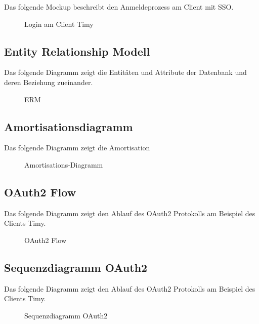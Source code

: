 Das folgende Mockup beschreibt den Anmeldeprozess am Client mit \acs{SSO}.
\begin{figure}[htb]
\centering
{}
\caption{Login am Client Timy}
\end{figure}
\clearpage

\subsection{Entity Relationship Modell}
\label{app:ERM}
Das folgende Diagramm zeigt die Entitäten und Attribute der Datenbank und deren Beziehung zueinander.
\begin{figure}[htb]
\centering
{}
\caption{ERM}
\end{figure}
\clearpage

\subsection{Amortisationsdiagramm}
\label{app:Amortisationsdiagramm}
Das folgende Diagramm zeigt die Amortisation
\begin{figure}[htb]
\centering
{}
\caption{Amortisations-Diagramm}
\end{figure}
\clearpage

\subsection{OAuth2 Flow}
\label{app:oauth2flow}
Das folgende Diagramm zeigt den Ablauf des OAuth2 Protokolls am Beispiel des Clients Timy.
\begin{figure}[htb]
\centering
{}
\caption{OAuth2 Flow}
\end{figure}
\clearpage

\subsection{Sequenzdiagramm OAuth2}
\label{app:sequenzdiagramm}
Das folgende Diagramm zeigt den Ablauf des OAuth2 Protokolls am Beispiel des Clients Timy.
\begin{figure}[htb]
\centering
{}
\caption{Sequenzdiagramm OAuth2}
\end{figure}
\clearpage




